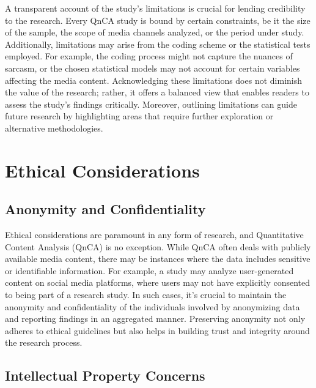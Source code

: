 \documentclass[
  b5paper]{book}
\begin{document}
A transparent account of the study's limitations is crucial for lending credibility to the research. Every QnCA study is bound by certain constraints, be it the size of the sample, the scope of media channels analyzed, or the period under study. Additionally, limitations may arise from the coding scheme or the statistical tests employed. For example, the coding process might not capture the nuances of sarcasm, or the chosen statistical models may not account for certain variables affecting the media content. Acknowledging these limitations does not diminish the value of the research; rather, it offers a balanced view that enables readers to assess the study's findings critically. Moreover, outlining limitations can guide future research by highlighting areas that require further exploration or alternative methodologies.

\hypertarget{ethical-considerations-4}{%
\section{Ethical Considerations}\label{ethical-considerations-4}}

\hypertarget{anonymity-and-confidentiality}{%
\subsection*{Anonymity and Confidentiality}\label{anonymity-and-confidentiality}}

Ethical considerations are paramount in any form of research, and Quantitative Content Analysis (QnCA) is no exception. While QnCA often deals with publicly available media content, there may be instances where the data includes sensitive or identifiable information. For example, a study may analyze user-generated content on social media platforms, where users may not have explicitly consented to being part of a research study. In such cases, it's crucial to maintain the anonymity and confidentiality of the individuals involved by anonymizing data and reporting findings in an aggregated manner. Preserving anonymity not only adheres to ethical guidelines but also helps in building trust and integrity around the research process.

\hypertarget{intellectual-property-concerns}{%
\subsection*{Intellectual Property Concerns}\label{intellectual-property-concerns}}
\end{document}
